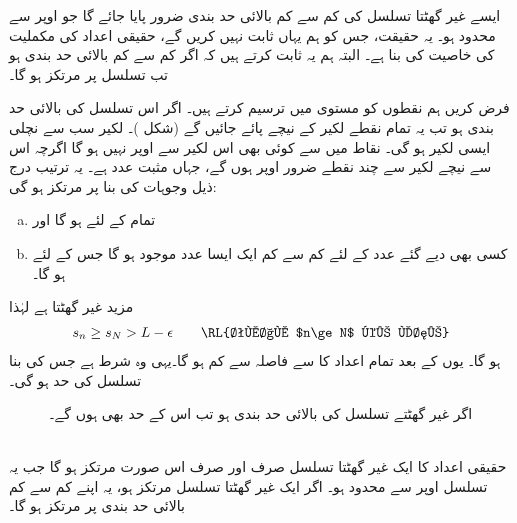 ایسے غیر گھٹتا تسلسل کی کم سے کم بالائی حد بندی ضرور پایا جائے گا جو اوپر سے محدود ہو۔ یہ حقیقت، جس کو ہم یہاں ثابت نہیں کریں گے، حقیقی اعداد کی مکملیت کی خاصیت کی بنا ہے۔ البتہ ہم یہ ثابت کرتے ہیں کہ اگر  کم سے کم بالائی حد بندی ہو تب  تسلسل  پر مرتکز ہو گا۔

فرض کریں ہم   نقطوں کو  مستوی میں ترسیم کرتے ہیں۔ اگر اس تسلسل کی بالائی حد بندی   ہو تب یہ تمام نقطے لکیر  کے نیچے پائے جائیں گے (شکل )۔ لکیر  سب سے نچلی ایسی لکیر ہو گی۔ نقاط  میں سے کوئی بھی اس لکیر سے اوپر نہیں ہو گا اگرچہ اس سے نیچے لکیر  سے چند نقطے  ضرور اوپر  ہوں گے، جہاں  مثبت عدد ہے۔ یہ ترتیب درج ذیل وجوہات کی بنا  پر مرتکز ہو گی:
\begin{enumerate}[a.]
\item
تمام  کے لئے  ہو گا اور
\item
کسی بھی دیے گئے عدد  کے لئے کم سے کم ایک ایسا عدد  موجود ہو گا جس کے لئے  ہو گا۔
\end{enumerate}
مزید  غیر گھٹتا ہے لہٰذا
\begin{align*} 
s_n\ge s_N>L-\epsilon\quad\quad  \text{\RL{تمام $n\ge N$ کے لئے}}
\end{align*}
ہو گا۔ یوں  کے بعد تمام اعداد  کا  سے فاصلہ  سے کم ہو گا۔یہی وہ شرط ہے جس کی بنا تسلسل  کی حد  ہو گی۔
\begin{figure}
\centering
{}
\caption{اگر غیر گھٹتے تسلسل کی بالائی حد بندی  ہو تب اس کے حد  بھی ہوں گے۔}
\label{شکل_تسلسل_بالائی_حد_بندی_اور_حد}
\end{figure}

\\
حقیقی اعداد کا ایک غیر گھٹتا تسلسل صرف اور صرف اس صورت مرتکز ہو گا جب یہ تسلسل اوپر سے محدود ہو۔ اگر ایک غیر گھٹتا تسلسل مرتکز ہو، یہ اپنے کم سے کم بالائی حد بندی پر مرتکز ہو گا۔

